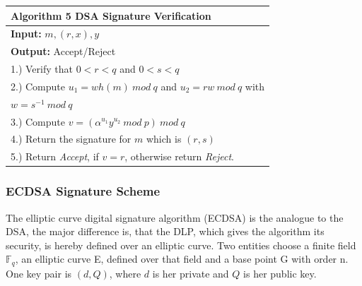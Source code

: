 \documentclass[a4paper, 10 pt, conference]{ieeeconf}
\begin{document}
\begin{table}[h!]
  \begin{center}
    \begin{tabularx}{\columnwidth}{ l   }
    \toprule
    \textbf{Algorithm 5} DSA Signature Verification \\ \midrule
    \textbf{Input:} $m,(r,x),y$ \\ 
    \textbf{Output:} Accept/Reject \\
    1.) Verify that $0 < r < q$ and $0 < s < q$\\
    2.) Compute $u_1 = wh(m) \ mod \ q$ and $u_2 = rw \ mod \ q$ with \\ $w = s^{-1} \ mod \ q$ \\
    3.) Compute $v = (\alpha^{u_1}y^{u_2} \ mod \ p) \ mod \ q$ \\
    4.) Return the signature for $m$ which is $(r,s)$\\
    5.) Return \emph{Accept}, if $v=r$, otherwise return \emph{Reject}. \\
    \bottomrule
    \end{tabularx}
  \end{center}
\end{table}


\vspace{0.5cm}
\subsubsection{\textbf{ECDSA Signature Scheme}}
The elliptic curve digital signature algorithm (ECDSA) is the analogue to the DSA, the major difference is, that the DLP, which gives the algorithm its security, is hereby defined over an elliptic curve. 
Two entities choose a finite field $\mathbb{F}_q$, an elliptic curve E, defined over that field and a base point G with order n. One key pair is $(d,Q)$, where $d$ is her private and $Q$ is her public key. 
\end{document}

